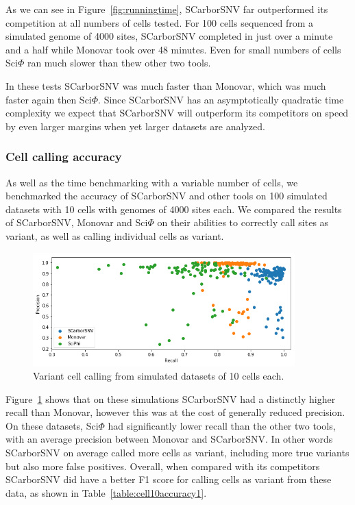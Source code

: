 \documentclass[../../main.tex]{subfiles}
\begin{document}
As we can see in Figure~\ref{fig:runningtime}, SCarborSNV far outperformed its competition at all numbers of cells tested.
For 100 cells sequenced from a simulated genome of 4000 sites, SCarborSNV completed in just over a minute and a half while Monovar took over 48 minutes.
Even for small numbers of cells Sci$\Phi$ ran much slower than thew other two tools.

In these tests SCarborSNV was much faster than Monovar, which was much faster again then Sci$\Phi$.
Since SCarborSNV has an asymptotically quadratic time complexity we expect that SCarborSNV will outperform its competitors on speed by even larger margins when yet larger datasets are analyzed.

\subsubsection*{Cell calling accuracy}
As well as the time benchmarking with a variable number of cells, we benchmarked the accuracy of SCarborSNV and other tools on 100 simulated datasets with 10 cells with genomes of 4000 sites each.
We compared the results of SCarborSNV, Monovar and Sci$\Phi$ on their abilities to correctly call sites as variant, as well as calling individual cells as variant.
\begin{figure}[h] 
    \includegraphics[width=0.9\textwidth]{sections/graphics/cell10accuracy1}
    \caption{Variant cell calling from simulated datasets of 10 cells each.}
    \label{fig:cell10accuracy1}
\end{figure}
Figure~\ref{fig:cell10accuracy1} shows that on these simulations SCarborSNV had a distinctly higher recall than Monovar, however this was at the cost of generally reduced precision.
On these datasets, Sci$\Phi$ had significantly lower recall than the other two tools, with an average precision between Monovar and SCarborSNV.
In other words SCarborSNV on average called more cells as variant, including more true variants but also more false positives.
Overall, when compared with its competitors SCarborSNV did have a better F1 score for calling cells as variant from these data, as shown in Table~\ref{table:cell10accuracy1}.
\end{document}
